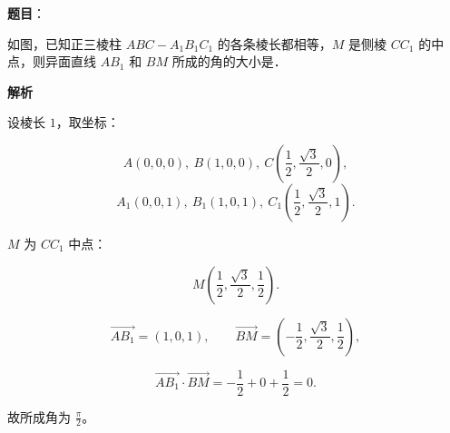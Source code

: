 \begin{answer}

\textbf{题目}：

如图，已知正三棱柱 $ABC-A_1B_1C_1$ 的各条棱长都相等，$M$ 是侧棱 $CC_1$ 的中点，则异面直线 $AB_1$ 和 $BM$ 所成的角的大小是\gkblank{}．
\nopagebreak[4]
\begin{center}\end{center}
\nopagebreak[4]
\textbf{解析}

设棱长 $1$，取坐标：

\nopagebreak[4]
\[A(0,0,0),\ B(1,0,0),\ C\left(\frac12,\frac{\sqrt3}{2},0\right),\]
\nopagebreak[4]
\[A_1(0,0,1),\ B_1(1,0,1),\ C_1\left(\frac12,\frac{\sqrt3}{2},1\right).\]

$M$ 为 $CC_1$ 中点：

\nopagebreak[4]
\[M\left(\frac12,\frac{\sqrt3}{2},\frac12\right).\]

\nopagebreak[4]
\[\overrightarrow{AB_1}=(1,0,1),\qquad
\overrightarrow{BM}=\left(-\frac12,\frac{\sqrt3}{2},\frac12\right),\]

\nopagebreak[4]
\[\overrightarrow{AB_1}\cdot\overrightarrow{BM}=-\frac12+0+\frac12=0 .\]

故所成角为 $\frac\pi2$。


\end{answer}
